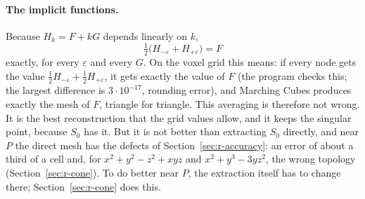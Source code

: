 \documentclass[12pt, a4paper]{article}
\theoremstyle{plain}
\theoremstyle{definition}
\theoremstyle{remark}
\theoremstyle{definition}
\begin{document}
\paragraph{The implicit functions.} Because $H_k=F+kG$ depends linearly on $k$,
\[
\tfrac12\big(H_{-\varepsilon}+H_{+\varepsilon}\big)=F
\]
exactly, for every $\varepsilon$ and every $G$. On the voxel grid this means: if every
node gets the value $\tfrac12H_{-\varepsilon}+\tfrac12H_{+\varepsilon}$, it gets
exactly the value of $F$ (the program checks this; the largest difference is
$3\cdot10^{-17}$, rounding error), and Marching Cubes produces exactly the mesh of
$F$, triangle for triangle. This averaging is therefore not wrong. It is the best
reconstruction that the grid values allow, and it keeps the singular point, because
$S_0$ has it. But it is not better than extracting $S_0$ directly, and near $P$ the
direct mesh has the defects of Section~\ref{sec:r-accuracy}: an error of about a
third of a cell and, for $x^2+y^2-z^2+xyz$ and $x^2+y^3-3yz^2$, the wrong topology
(Section~\ref{sec:r-cone}). To do better near $P$, the extraction itself has to
change there; Section~\ref{sec:r-cone} does this.
\end{document}
